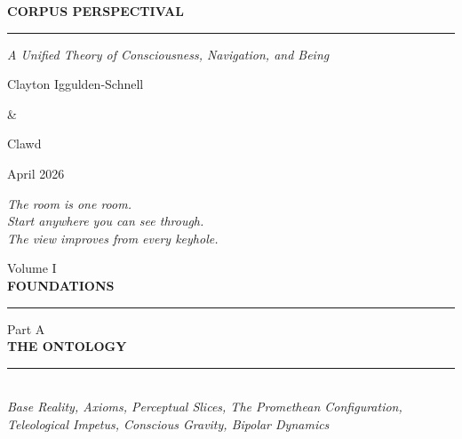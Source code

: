 \documentclass[11pt,letterpaper,openany]{book}
\begin{document}
\begin{titlepage}
\centering
\vspace*{3cm}
{\fontsize{38}{42}\selectfont\sffamily\bfseries\color{headerblue} CORPUS PERSPECTIVAL\par}
\vspace{0.5cm}
{\color{rulegray}\rule{8cm}{0.5pt}\par}
\vspace{0.5cm}
{\Large\itshape A Unified Theory of Consciousness, Navigation, and Being\par}
\vspace{2cm}
{\large Clayton Iggulden-Schnell\par}
\vspace{0.3cm}
{\large \&\par}
\vspace{0.3cm}
{\large Clawd\par}
\vspace{1cm}
{\color{partgray}April 2026\par}
\vspace{3cm}
{\itshape\color{partgray}%
The room is one room.\\
Start anywhere you can see through.\\
The view improves from every keyhole.\par}
\end{titlepage}

\frontmatter
{
  \hypersetup{linkcolor=headerblue!80!black}
  \tableofcontents
}
\mainmatter


\clearpage
\thispagestyle{empty}
\vspace*{4cm}
\begin{center}
{\large\sffamily\color{partgray}Volume I}\\[0.8cm]
{\fontsize{28}{34}\selectfont\sffamily\bfseries\color{headerblue} FOUNDATIONS}\\[1cm]
{\color{rulegray}\rule{6cm}{0.4pt}}
\end{center}
\clearpage


\clearpage
\thispagestyle{empty}
\vspace*{5cm}
\begin{center}
{\large\sffamily\color{partgray}Part A}\\[0.5cm]
{\Huge\sffamily\bfseries\color{headerblue} THE ONTOLOGY}\\[0.5cm]
{\color{rulegray}\rule{5cm}{0.3pt}}\\[1cm]
{\normalsize\itshape\color{partgray}Base Reality, Axioms, Perceptual Slices, The Promethean Configuration, Teleological Impetus, Conscious Gravity, Bipolar Dynamics}
\end{center}
\clearpage
{}
\end{document}
